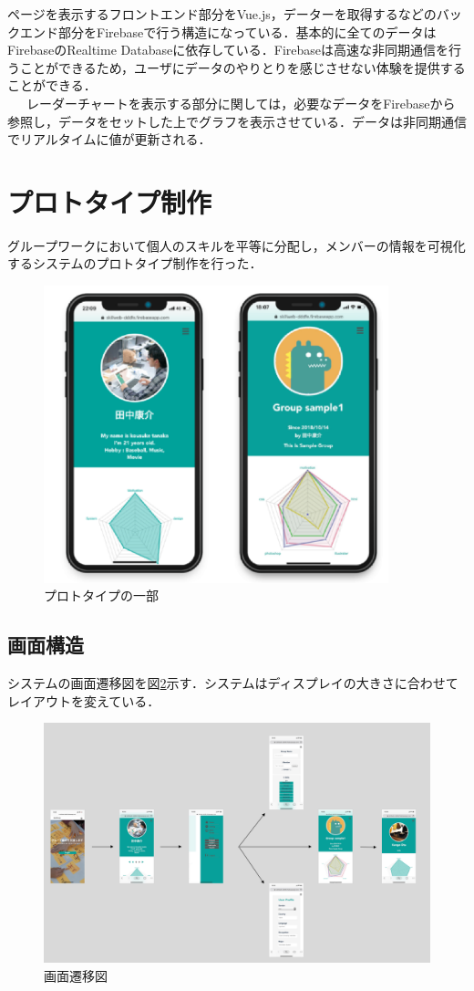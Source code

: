 \documentclass{funthesis}
\begin{document}
ページを表示するフロントエンド部分をVue.js，データーを取得するなどのバックエンド部分をFirebaseで行う構造になっている．基本的に全てのデータはFirebaseのRealtime Databaseに依存している．Firebaseは高速な非同期通信を行うことができるため，ユーザにデータのやりとりを感じさせない体験を提供することができる．\\
\ \ \ レーダーチャートを表示する部分に関しては，必要なデータをFirebaseから参照し，データをセットした上でグラフを表示させている．データは非同期通信でリアルタイムに値が更新される．


\section{プロトタイプ制作}

グループワークにおいて個人のスキルを平等に分配し，メンバーの情報を可視化するシステムのプロトタイプ制作を行った．
\begin{figure}[H]
 \centering
   \includegraphics[width=100mm]{figures/gamen.png}
 \caption{プロトタイプの一部}
 \label{gamen}
\end{figure}

\subsection{画面構造}
システムの画面遷移図を図\ref{gamensenni}示す．システムはディスプレイの大きさに合わせてレイアウトを変えている．
\begin{figure}[H]
 \centering
   \includegraphics[width=130mm]{figures/gamennsennizu2.png}
 \caption{画面遷移図}
 \label{gamensenni}
\end{figure}
\end{document}
